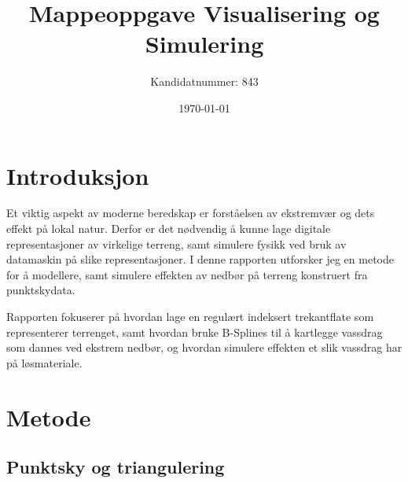 \documentclass[norsk, doc, 11pt, a4paper]{apa7}  %
\title{Mappeoppgave Visualisering og Simulering}   %
\author{Kandidatnummer: 843}               %
\affiliation{Høgskolen i Innlandet}
\date{\today}                             %
\begin{document}
\maketitle                                %
\tableofcontents

\section{Introduksjon}
Et viktig aspekt av moderne beredskap er forståelsen av ekstremvær og dets effekt på lokal natur. Derfor er det nødvendig å kunne lage digitale representasjoner av virkelige terreng, samt simulere fysikk ved bruk av datamaskin på slike representasjoner. I denne rapporten utforsker jeg en metode for å modellere, samt simulere effekten av nedbør på terreng konstruert fra punktskydata.

Rapporten fokuserer på hvordan lage en regulært indeksert trekantflate som representerer terrenget, samt hvordan bruke B-Splines til å kartlegge vassdrag som dannes ved ekstrem nedbør, og hvordan simulere effekten et slik vassdrag har på løsmateriale.

\section{Metode}
\subsection{Punktsky og triangulering}
\end{document}

